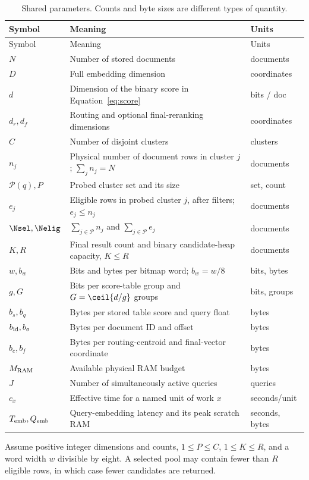 \small
\begin{longtable}{@{}P{.17\linewidth}P{.64\linewidth}P{.13\linewidth}@{}}
\caption{Shared parameters. Counts and byte sizes are different types of quantity.}\label{tab:parameters}\\
\toprule Symbol & Meaning & Units\\\midrule\endfirsthead
\toprule Symbol & Meaning & Units\\\midrule\endhead
$N$ & Number of stored documents & documents\\
$D$ & Full embedding dimension & coordinates\\
$d$ & Dimension of the binary score in Equation~\eqref{eq:score} & bits / doc\\
$d_r,d_f$ & Routing and optional final-reranking dimensions & coordinates\\
$C$ & Number of disjoint clusters & clusters\\
$n_j$ & Physical number of document rows in cluster $j$; $\sum_j n_j=N$ & documents\\
$\mathcal P(q),P$ & Probed cluster set and its size & set, count\\
$e_j$ & Eligible rows in probed cluster $j$, after filters; $e_j\leq n_j$ & documents\\
$\Nsel,\Nelig$ & $\sum_{j\in\mathcal P}n_j$ and $\sum_{j\in\mathcal P}e_j$ & documents\\
$K,R$ & Final result count and binary candidate-heap capacity, $K\leq R$ & documents\\
$w,b_w$ & Bits and bytes per bitmap word; $b_w=w/8$ & bits, bytes\\
$g,G$ & Bits per score-table group and $G=\ceil{d/g}$ groups & bits, groups\\
$b_s,b_q$ & Bytes per stored table score and query float & bytes\\
$b_{\rm id},b_o$ & Bytes per document ID and offset & bytes\\
$b_c,b_f$ & Bytes per routing-centroid and final-vector coordinate & bytes\\
$M_{\rm RAM}$ & Available physical RAM budget & bytes\\
$J$ & Number of simultaneously active queries & queries\\
$c_x$ & Effective time for a named unit of work $x$ & seconds/unit\\
$T_{\rm emb},Q_{\rm emb}$ & Query-embedding latency and its peak scratch RAM & seconds, bytes\\
\bottomrule
\end{longtable}
\normalsize
Assume positive integer dimensions and counts, $1\leq P\leq C$, $1\leq K\leq R$, and a word width $w$ divisible by eight. A selected pool may contain fewer than $R$ eligible rows, in which case fewer candidates are returned.

